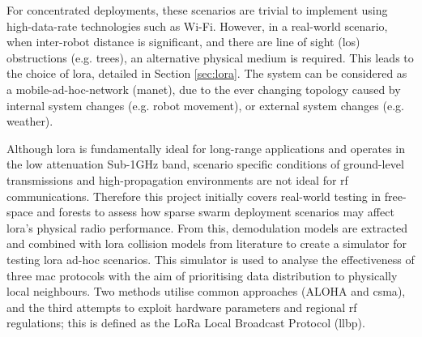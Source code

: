 For concentrated deployments, these scenarios are trivial to implement using high-data-rate technologies such as Wi-Fi. However, in a real-world scenario, when inter-robot distance is significant, and there are line of sight (\ac{los}) obstructions (e.g. trees), an alternative physical medium is required. This leads to the choice of \ac{lora}, detailed in Section \ref{sec:lora}. The system can be considered as a mobile-ad-hoc-network (\ac{manet}), due to the ever changing topology caused by internal system changes (e.g. robot movement), or external system changes (e.g. weather).

Although \ac{lora} is fundamentally ideal for long-range applications and operates in the low attenuation Sub-1GHz band, scenario specific conditions of ground-level transmissions and high-propagation environments are not ideal for \ac{rf} communications. Therefore this project initially covers real-world testing in free-space and forests to assess how sparse swarm deployment scenarios may affect \ac{lora}'s physical radio performance. From this, demodulation models are extracted and combined with \ac{lora} collision models from literature to create a simulator for testing \ac{lora} ad-hoc scenarios. This simulator is used to analyse the effectiveness of three \ac{mac} protocols with the aim of prioritising data distribution to physically local neighbours. Two methods utilise common approaches (ALOHA and \ac{csma}), and the third attempts to exploit hardware parameters and regional \ac{rf} regulations; this is defined as the LoRa Local Broadcast Protocol (\ac{llbp}).




